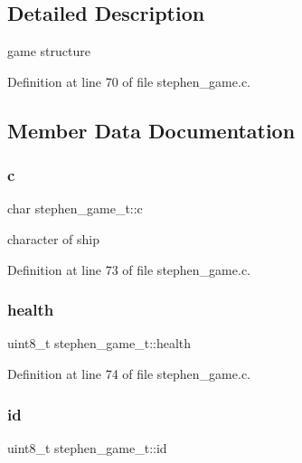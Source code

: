 \subsection{Detailed Description}
game structure 

Definition at line 70 of file stephen\+\_\+game.\+c.



\subsection{Member Data Documentation}
\mbox{\label{structstephen__game__t_a0a1090bb518acd0e060a3824fd855548}} 
\subsubsection{\texorpdfstring{c}{c}}
{\footnotesize\ttfamily char stephen\+\_\+game\+\_\+t\+::c}



character of ship 



Definition at line 73 of file stephen\+\_\+game.\+c.

\mbox{\label{structstephen__game__t_aaca290ce9f7cecd8f62d6f653e5b5ac3}} 
\subsubsection{\texorpdfstring{health}{health}}
{\footnotesize\ttfamily uint8\+\_\+t stephen\+\_\+game\+\_\+t\+::health}



Definition at line 74 of file stephen\+\_\+game.\+c.

\mbox{\label{structstephen__game__t_ab55bf04b1c1d7f8efe5c006b20be3b89}} 
\subsubsection{\texorpdfstring{id}{id}}
{\footnotesize\ttfamily uint8\+\_\+t stephen\+\_\+game\+\_\+t\+::id}



